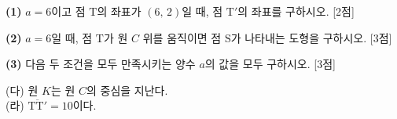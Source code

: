 \documentclass[10pt]{article}
\begin{document}
\begin{pagepair}
{\vspace*{4mm}
\textbf{(1)} $a=6$이고 점 $\mathrm{T}$의 좌표가 $(6,\,2)$일 때, 점 $\mathrm{T}'$의 좌표를 구하시오. [2점]
\vfill
}{%
\textbf{(2)} $a=6$일 때, 점 $\mathrm{T}$가 원 $C$ 위를 움직이면 점 $\mathrm{S}$가 나타내는 도형을 구하시오. [3점]
\vfill

\textbf{(3)} 다음 두 조건을 모두 만족시키는 양수 $a$의 값을 모두 구하시오. [3점]
\begin{conditions}
(다) 원 $K$는 원 $C$의 중심을 지난다.\\
(라) $\overline{\mathrm{TT}'}=10$이다.
\end{conditions}
\vspace*{-6mm}
\vfill\null
}
\end{pagepair}

\end{document}
